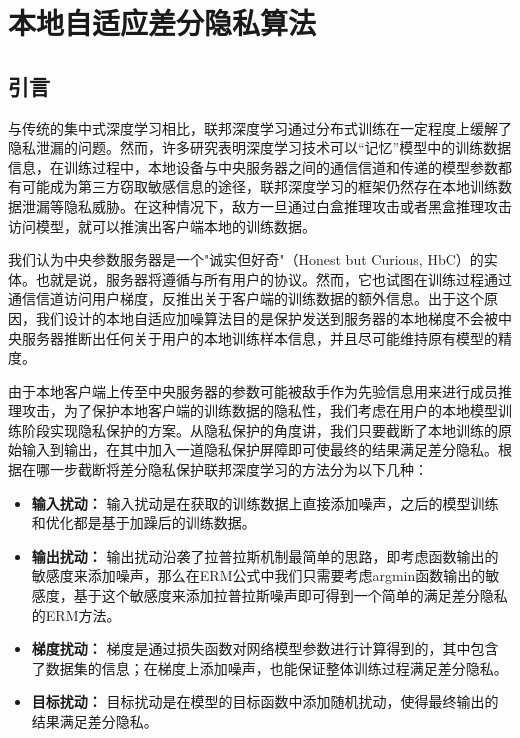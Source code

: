 \chapter{本地自适应差分隐私算法}

\label{ch3}

\section{引言}
与传统的集中式深度学习相比，联邦深度学习通过分布式训练在一定程度上缓解了隐私泄漏的问题。然而，许多研究表明深度学习技术可以“记忆”模型中的训练数据信息，在训练过程中，本地设备与中央服务器之间的通信信道和传递的模型参数都有可能成为第三方窃取敏感信息的途径，联邦深度学习的框架仍然存在本地训练数据泄漏等隐私威胁。在这种情况下，敌方一旦通过白盒推理攻击或者黑盒推理攻击访问模型，就可以推演出客户端本地的训练数据。

我们认为中央参数服务器是一个"诚实但好奇"（Honest but Curious, HbC）的实体。也就是说，服务器将遵循与所有用户的协议。然而，它也试图在训练过程通过通信信道访问用户梯度，反推出关于客户端的训练数据的额外信息。出于这个原因，我们设计的本地自适应加噪算法目的是保护发送到服务器的本地梯度不会被中央服务器推断出任何关于用户的本地训练样本信息，并且尽可能维持原有模型的精度。

由于本地客户端上传至中央服务器的参数可能被敌手作为先验信息用来进行成员推理攻击，为了保护本地客户端的训练数据的隐私性，我们考虑在用户的本地模型训练阶段实现隐私保护的方案。从隐私保护的角度讲，我们只要截断了本地训练的原始输入到输出，在其中加入一道隐私保护屏障即可使最终的结果满足差分隐私。根据在哪一步截断将差分隐私保护联邦深度学习的方法分为以下几种：
\begin{itemize}
	\item \textbf{输入扰动：} 输入扰动是在获取的训练数据上直接添加噪声，之后的模型训练和优化都是基于加躁后的训练数据。
	\item \textbf{输出扰动：} 输出扰动沿袭了拉普拉斯机制最简单的思路，即考虑函数输出的敏感度来添加噪声，那么在ERM公式中我们只需要考虑argmin函数输出的敏感度，基于这个敏感度来添加拉普拉斯噪声即可得到一个简单的满足差分隐私的ERM方法。
	\item \textbf{梯度扰动：} 梯度是通过损失函数对网络模型参数进行计算得到的，其中包含了数据集的信息；在梯度上添加噪声，也能保证整体训练过程满足差分隐私。
	\item \textbf{目标扰动：} 目标扰动是在模型的目标函数中添加随机扰动，使得最终输出的结果满足差分隐私。
\end{itemize}


